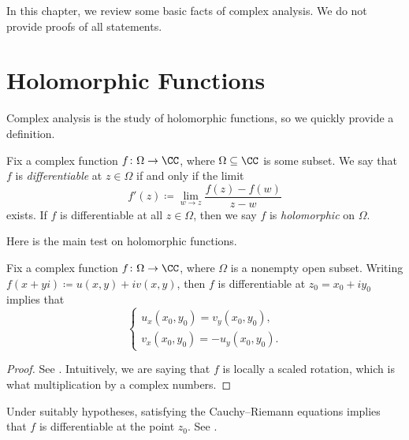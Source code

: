 \documentclass[notes.tex]{subfiles}
\begin{document}
In this chapter, we review some basic facts of complex analysis. We do not provide proofs of all statements.

\section{Holomorphic Functions}
Complex analysis is the study of holomorphic functions, so we quickly provide a definition.
\begin{definition}[holomorphic]
	Fix a complex function $f\colon\Omega\to\CC$, where $\Omega\subseteq\CC$ is some subset. We say that $f$ is \textit{differentiable} at $z\in\Omega$ if and only if the limit
	\[f'(z)\coloneqq\lim_{w\to z}\frac{f(z)-f(w)}{z-w}\]
	exists. If $f$ is differentiable at all $z\in\Omega$, then we say $f$ is \textit{holomorphic} on $\Omega$.
\end{definition}
Here is the main test on holomorphic functions.
\begin{theorem} \label{thm:cr-equations}
	Fix a complex function $f\colon\Omega\to\CC$, where $\Omega$ is a nonempty open subset. Writing $f(x+yi)\coloneqq u(x,y)+iv(x,y)$, then $f$ is differentiable at $z_0=x_0+iy_0$ implies that
	\[\begin{cases}
		u_x(x_0,y_0) = v_y(x_0,y_0), \\
		v_x(x_0,y_0) = -u_y(x_0,y_0).
	\end{cases}\]
\end{theorem}
\begin{proof}
	See \cite[Theorem~3.19]{nir-complex-analysis}. Intuitively, we are saying that $f$ is locally a scaled rotation, which is what multiplication by a complex numbers.
\end{proof}
\begin{remark}
	Under suitably hypotheses, satisfying the Cauchy--Riemann equations implies that $f$ is differentiable at the point $z_0$. See \cite[Theorem~3.26]{nir-complex-analysis}.
\end{remark}
\end{document}
